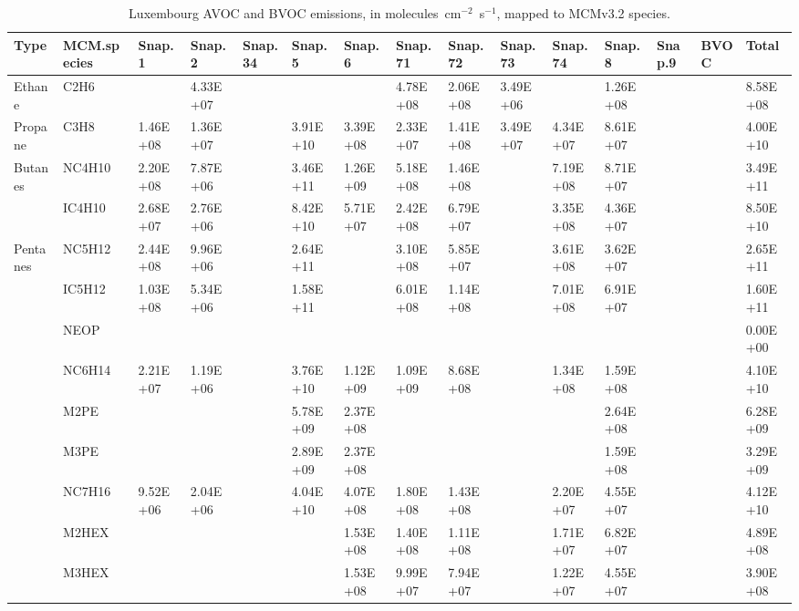 \tiny
\begin{longtable}{lllllllllllllll}
	\caption{Luxembourg AVOC and BVOC emissions, in molecules~cm$^{-2}$~s$^{-1}$, mapped to MCMv3.2 species.}\\%
	\hline \hline
	\textbf{Type} & \textbf{MCM.species} & \textbf{Snap.1} & \textbf{Snap.2} & \textbf{Snap.34} & \textbf{Snap.5} & \textbf{Snap.6} & \textbf{Snap.71} & \textbf{Snap.72} & \textbf{Snap.73} & \textbf{Snap.74} & \textbf{Snap.8} & \textbf{Snap.9} & \textbf{BVOC} & \textbf{Total}\\
	\endhead
	\hline
	Ethane & C2H6 &  & 4.33E+07 &  &  &  & 4.78E+08 & 2.06E+08 & 3.49E+06 &  & 1.26E+08 &  &  & 8.58E+08 \\
	\hline Propane & C3H8 & 1.46E+08 & 1.36E+07 &  & 3.91E+10 & 3.39E+08 & 2.33E+07 & 1.41E+08 & 3.49E+07 & 4.34E+07 & 8.61E+07 &  &  & 4.00E+10 \\ \hline
	\multirow{2}{*}{Butanes} & NC4H10 & 2.20E+08 & 7.87E+06 &  & 3.46E+11 & 1.26E+09 & 5.18E+08 & 1.46E+08 &  & 7.19E+08 & 8.71E+07 &  &  & 3.49E+11 \\
	 & IC4H10 & 2.68E+07 & 2.76E+06 &  & 8.42E+10 & 5.71E+07 & 2.42E+08 & 6.79E+07 &  & 3.35E+08 & 4.36E+07 &  &  & 8.50E+10 \\
	\hline \multirow{3}{*}{Pentanes} & NC5H12 & 2.44E+08 & 9.96E+06 &  & 2.64E+11 &  & 3.10E+08 & 5.85E+07 &  & 3.61E+08 & 3.62E+07 &  &  & 2.65E+11 \\
	 & IC5H12 & 1.03E+08 & 5.34E+06 &  & 1.58E+11 &  & 6.01E+08 & 1.14E+08 &  & 7.01E+08 & 6.91E+07 &  &  & 1.60E+11 \\
	 & NEOP &  &  &  &  &  &  &  &  &  &  &  &  & 0.00E+00 \\
	\hline \parbox[t]{2mm}{} & NC6H14 & 2.21E+07 & 1.19E+06 &  & 3.76E+10 & 1.12E+09 & 1.09E+09 & 8.68E+08 &  & 1.34E+08 & 1.59E+08 &  &  & 4.10E+10 \\
	 & M2PE &  &  &  & 5.78E+09 & 2.37E+08 &  &  &  &  & 2.64E+08 &  &  & 6.28E+09 \\
	 & M3PE &  &  &  & 2.89E+09 & 2.37E+08 &  &  &  &  & 1.59E+08 &  &  & 3.29E+09 \\
	 & NC7H16 & 9.52E+06 & 2.04E+06 &  & 4.04E+10 & 4.07E+08 & 1.80E+08 & 1.43E+08 &  & 2.20E+07 & 4.55E+07 &  &  & 4.12E+10 \\
	 & M2HEX &  &  &  &  & 1.53E+08 & 1.40E+08 & 1.11E+08 &  & 1.71E+07 & 6.82E+07 &  &  & 4.89E+08 \\
	 & M3HEX &  &  &  &  & 1.53E+08 & 9.99E+07 & 7.94E+07 &  & 1.22E+07 & 4.55E+07 &  &  & 3.90E+08 \\

\end{longtable}
